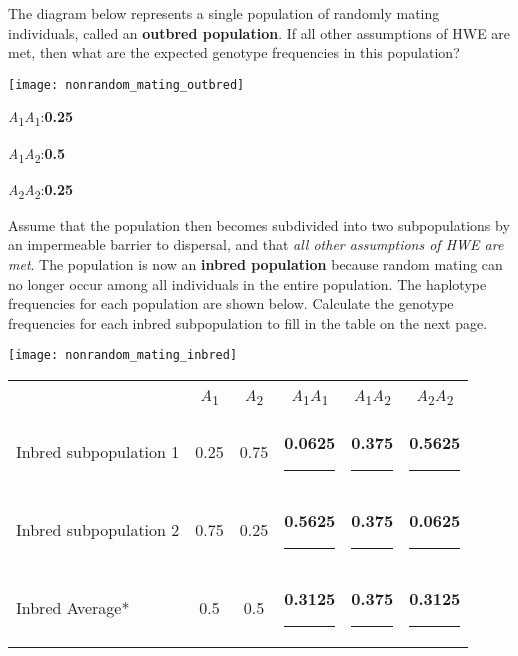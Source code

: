 \documentclass[11pt, addpoints]{exam}
\begin{document}
\begin{questions}

\question[1]
The diagram below represents a single population of randomly
mating individuals, called an \textbf{outbred population}. If all other assumptions of HWE are met, then what
are the expected genotype frequencies in this population?

\begin{center}
	\texttt{[image: nonrandom\_mating\_outbred]}
\end{center}

\qquad\emph{A}\textsubscript{1}\emph{A}\textsubscript{1}:\ifprintanswers\quad\textbf{0.25}\fi\vspace{\baselineskip}

\qquad\emph{A}\textsubscript{1}\emph{A}\textsubscript{2}:\ifprintanswers\quad\textbf{0.5}\fi\vspace{\baselineskip}

\qquad\emph{A}\textsubscript{2}\emph{A}\textsubscript{2}:\ifprintanswers\quad\textbf{0.25}\fi\vspace{0.5\baselineskip}



\question[3]
Assume that the population then becomes subdivided into two
subpopulations by an impermeable barrier to dispersal, and that
\emph{all other assumptions of HWE are met}. The population is now an \textbf{inbred population} because random mating can no longer occur among all individuals in the entire population. The haplotype frequencies
for each population are shown below. Calculate the genotype frequencies
for each inbred subpopulation to fill in the table on the next page.

\begin{center}
	\texttt{[image: nonrandom\_mating\_inbred]}
\end{center}

{\large
\begin{longtable}[c]{@{}lccccc@{}}
\toprule
& \emph{A}\textsubscript{1} &%
\emph{A}\textsubscript{2} &%
\emph{A}\textsubscript{1}\emph{A}\textsubscript{1} &%
\emph{A}\textsubscript{1}\emph{A}\textsubscript{2} &%
\emph{A}\textsubscript{2}\emph{A}\textsubscript{2} \\[0.35cm]
Inbred subpopulation 1 &%
	 0.25 &%
	 0.75 &%
	 \ifprintanswers\textbf{0.0625}\else\rule{0.5in}{0.4pt}\fi &%
	 \ifprintanswers\textbf{0.375}\else\rule{0.5in}{0.4pt}\fi &%
	 \ifprintanswers\textbf{0.5625}\else\rule{0.5in}{0.4pt}\fi \\[0.35cm] 
Inbred subpopulation 2 &%
	0.75 &%
	0.25 &%
	\ifprintanswers\textbf{0.5625}\else\rule{0.5in}{0.4pt}\fi &%
	\ifprintanswers\textbf{0.375}\else\rule{0.5in}{0.4pt}\fi &%
	\ifprintanswers\textbf{0.0625}\else\rule{0.5in}{0.4pt}\fi \\[0.35cm]
Inbred Average* &%
	0.5 &%
	0.5 &%
	\ifprintanswers\textbf{0.3125}\else\rule{0.5in}{0.4pt}\fi &%
	\ifprintanswers\textbf{0.375}\else\rule{0.5in}{0.4pt}\fi &%
	\ifprintanswers\textbf{0.3125}\else\rule{0.5in}{0.4pt}\fi \tabularnewline
\bottomrule
\end{longtable}
}%


\end{questions}
\end{document}
